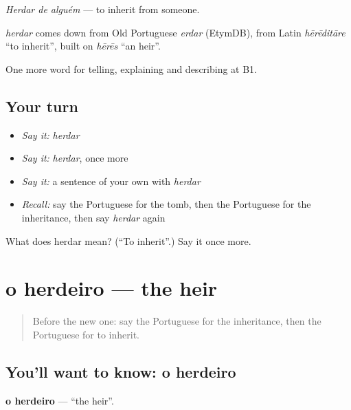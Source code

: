 \emph{Herdar de alguém} — to inherit from someone.

\begin{cousinweb}
\emph{herdar} comes down from Old Portuguese \emph{erdar} (EtymDB), from Latin \emph{hērēditāre} \textquotedblleft{}to inherit\textquotedblright{}, built on \emph{hērēs} \textquotedblleft{}an heir\textquotedblright{}.
\end{cousinweb}

\begin{grammarlens}[title={What you've built}]
One more word for telling, explaining and describing at B1.
\end{grammarlens}

\subsection*{Your turn}
\begin{itemize}
\raggedright
  \item \emph{Say it:} \emph{herdar}
  \item \emph{Say it:} \emph{herdar}, once more
  \item \emph{Say it:} a sentence of your own with \emph{herdar}
  \item \emph{Recall:} say the Portuguese for the tomb, then the Portuguese for the inheritance, then say \emph{herdar} again
\end{itemize}

\begin{tcolorbox}[breakable,colback=teal!4,colframe=teal!35!black,title={Before you move on}]
What does herdar mean? (\textquotedblleft{}To inherit\textquotedblright{}.) Say it once more.
\end{tcolorbox}
\section[o herdeiro]{o herdeiro — the heir}

\label{lesson:PT-C316-herdeiro}



\begin{quote}
Before the new one: say the Portuguese for the inheritance, then the Portuguese for to inherit.
\end{quote}

\subsection*{You'll want to know: o herdeiro}
\textbf{o herdeiro} — \textquotedblleft{}the heir\textquotedblright{}.

